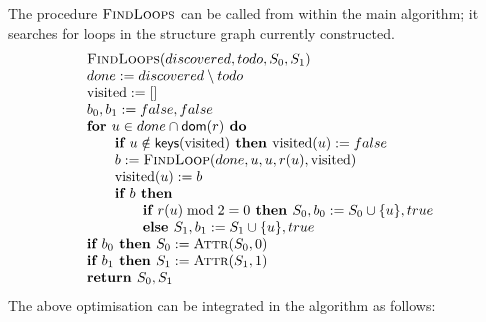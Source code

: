 \documentclass{article}
\begin{document}
The procedure $\textsc{FindLoops}$ can be called from within the main algorithm; it searches for loops in the structure graph currently constructed.
\begin{equation*}
\begin{array}{l}
\text{\textsc{FindLoops}}(discovered, todo, S_0, S_1)\\  %
done := discovered \setminus todo \\
\text{visited} := [] \\
b_0,b_1 := false,false \\
\textbf{for } u \in done \cap \textsf{dom}(r) \textbf{ do} \\
\qquad \textbf{if } u \notin \textsf{keys}(\text{visited}) \textbf{ then } \text{visited}(u) := false\\
\qquad b := \textsc{FindLoop}(done, u, u, r(u), \text{visited}) \\
\qquad \text{visited}(u) := b\\
\qquad \textbf{if } b \textbf{ then } \\
\qquad \qquad \textbf{if } r(u) \bmod 2 = 0 \textbf{ then } S_0,b_0 := S_0 \cup \{u\}, true\\
\qquad\qquad \textbf{else } S_1,b_1 := S_1 \cup \{u\}, true\\
\textbf{if } b_0 \textbf{ then } S_0 := \textsc{Attr}(S_0, 0)\\ 
\textbf{if } b_1 \textbf{ then } S_1 := \textsc{Attr}(S_1, 1)\\ 
\textbf{return } S_0, S_1
\end{array}
\end{equation*}
The above optimisation can be integrated in the algorithm as follows:
\end{document}
